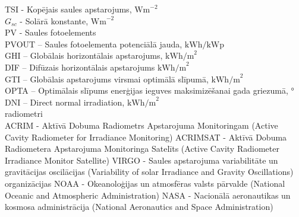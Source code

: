 \noindent TSI - Kopējais saules apstarojums, $\textrm{Wm}^{-2}$\\
$G_{sc}$ - Solārā konstante, $\textrm{Wm}^{-2}$\\
PV - Saules fotoelements\\
PVOUT – Saules fotoelementa potenciālā jauda, $\textrm{kWh/kWp}$\\ %
GHI – Globālais horizontālais apstarojums,  $\textrm{kWh/m}^2$\\ %
DIF – Difūzais horizontālais apstarojums  $\textrm{kWh/m}^2$\\ %
GTI – Globālais apstarojums virsmai optimālā slīpumā, $\textrm{kWh/m}^2$\\ %
OPTA – Optimālais slīpums enerģijas ieguves maksimizēšanai gada griezumā, °\\ %
DNI – Direct normal irradiation, $\textrm{kWh/m}^2$\\ %


radiometri\\
ACRIM - Aktīvā Dobuma Radiometrs Apstarojuma Monitoringam (Active Cavity Radiometer for Irradiance Monitoring)
ACRIMSAT - Aktīvā Dobuma Radiometera Apstarojuma Monitoringa Satelīts (Active Cavity Radiometer Irradiance Monitor Satellite) 
VIRGO - Saules apstarojuma variabilitāte un gravitācijas oscilācijas (Variability of solar Irradiance and Gravity Oscillations)
organizācijas
NOAA - Okeanoloģijas un atmosfēras valsts pārvalde (National Oceanic and Atmospheric Administration)
NASA - Nacionālā aeronautikas un kosmosa administrācija  (National Aeronautics and Space Administration)